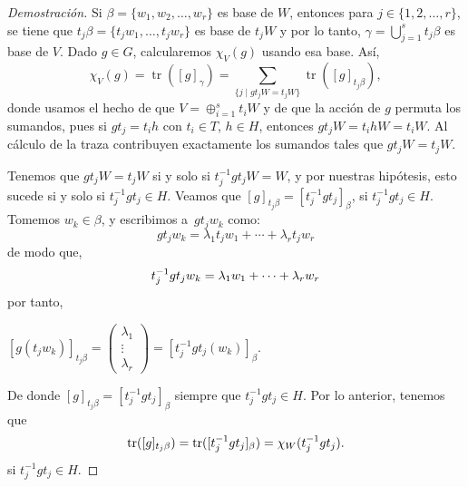 \documentclass[12pt]{book}
\theoremstyle{definition}
\DeclareMathOperator{\tr}{tr}
\newcounter{in}
\begin{document}
\begin{proof}[Demostración]
  Si $\beta=\{w_{1},w_{2},\ldots,w_{r}\}$ es base de $W$, entonces
  para $j\in\{1,2,\ldots,r\}$, se tiene que 
  $t_{j}\beta=\{t_{j}w_{1},\ldots,t_{j}w_{r}\}$ es base de $t_{j}W$ y
  por lo tanto, $\gamma=\bigcup^{s}_{j=1}t_{j}\beta$ es
  base de $V$. Dado $g\in G$, calcularemos $\chi_{V}(g)$
  usando esa base. Así,
  \begin{equation}
    \label{car-base-tjb}    
    \chi_{V}(g)=\tr([g]_{\gamma})=\sum_{\{j\mid gt_{j}W= t_{j}W\}}\tr([g]_{t_{j}\beta}),
  \end{equation}
  donde usamos el hecho de que $V=\oplus^{s}_{i=1}t_{i}W$ y de que la
  acción de $g$ permuta los sumandos, pues si $gt_{j}=t_{i}h$ con
  $t_{i}\in T$, $h\in H$, entonces $gt_{j}W=t_{i}hW=t_{i}W$. Al
  cálculo de la traza contribuyen exactamente los sumandos tales que
  $gt_{j}W=t_{j}W$. 

  Tenemos que $gt_{j}W= t_{j}W$ si y solo si $t_{j}^{-1}gt_{j}W= W$,
  y por nuestras hipótesis, esto sucede si y solo si
  $t_{j}^{-1}gt_{j}\in H$. Veamos que $[g]_{t_{j}\beta}=[t^{-1}_{j}gt_{j}]_{\beta}$, si
  $t^{-1}_{j}gt_{j}\in H$. Tomemos $w_{k}\in \beta$, y escribimos a~$gt_{j}w_{k}$ como:
  \begin{equation*}
    gt_{j}w_{k}=\lambda_{1}t_{j}w_{1}+\cdots+\lambda_{r}t_{j}w_{r}
  \end{equation*}
  de modo que,
  \begin{equation*}
    t^{-1}_{j}gt_{j}w_{k}=\lambda_{1}w_{1}+\cdots+\lambda_{r}w_{r}\\
  \end{equation*}
  por tanto,
   \begin{center}
    $[g(t_{j}w_{k})]_{t_{j}\beta}=\begin{pmatrix}
      \lambda_{1}  \\
      \vdots  \\
      \lambda_{r}  
    \end{pmatrix}=[t^{-1}_{j}gt_{j}(w_{k})]_{\beta}$.
  \end{center}
  De donde $[g]_{t_{j}\beta}=[t^{-1}_{j}gt_{j}]_{\beta}$ siempre que $t_{j}^{-1}gt_{j}\in H$.
  Por lo anterior, tenemos que
  \begin{equation*}
    \tr([g]_{t_{j}\beta})=\tr([t^{-1}_{j}gt_{j}]_{\beta})=\chi_{W}(t^{-1}_{j}gt_{j}).\\
  \end{equation*}
  si $t_{j}^{-1}gt_{j}\in H$.


\end{proof}
\end{document}
